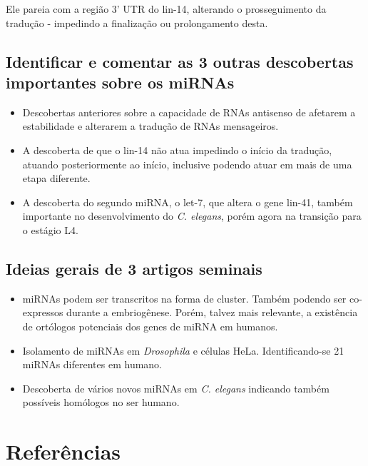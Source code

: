 \documentclass[
]{book}
\begin{document}
Ele pareia com a região 3' UTR do lin-14, alterando o prosseguimento da tradução - impedindo a finalização ou prolongamento desta.

\hypertarget{identificar-e-comentar-as-3-outras-descobertas-importantes-sobre-os-mirnas}{%
\section{Identificar e comentar as 3 outras descobertas importantes sobre os miRNAs}\label{identificar-e-comentar-as-3-outras-descobertas-importantes-sobre-os-mirnas}}

\begin{itemize}
\item
  Descobertas anteriores sobre a capacidade de RNAs antisenso de afetarem a estabilidade e alterarem a tradução de RNAs mensageiros.
\item
  A descoberta de que o lin-14 não atua impedindo o início da tradução, atuando posteriormente ao início, inclusive podendo atuar em mais de uma etapa diferente.
\item
  A descoberta do segundo miRNA, o let-7, que altera o gene lin-41, também importante no desenvolvimento do \emph{C. elegans}, porém agora na transição para o estágio L4.
\end{itemize}

\hypertarget{ideias-gerais-de-3-artigos-seminais}{%
\section{Ideias gerais de 3 artigos seminais}\label{ideias-gerais-de-3-artigos-seminais}}

\begin{itemize}
\item
  \citep{Lau_2001} miRNAs podem ser transcritos na forma de cluster. Também podendo ser co-expressos durante a embriogênese. Porém, talvez mais relevante, a existência de ortólogos potenciais dos genes de miRNA em humanos.
\item
  \citep{Lagos_Quintana_2001} Isolamento de miRNAs em \emph{Drosophila} e células HeLa. Identificando-se 21 miRNAs diferentes em humano.
\item
  \citep{Lee_2001} Descoberta de vários novos miRNAs em \emph{C. elegans} indicando também possíveis homólogos no ser humano.
\end{itemize}

\hypertarget{referuxeancias}{%
\chapter{Referências}\label{referuxeancias}}

  
\end{document}
